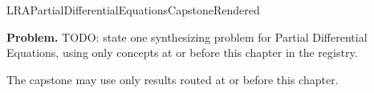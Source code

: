 \ifcsname LRAPartialDifferentialEquationsCapstoneRendered\endcsname
\else
\expandafter\gdef\csname LRAPartialDifferentialEquationsCapstoneRendered\endcsname{}

\newpage
{}
\label{cap:partial-differential-equations}

\begin{tcolorbox}[
  colback=gray!6,
  colframe=gray!40,
  arc=2pt,
  left=8pt, right=8pt, top=6pt, bottom=6pt,
  title={\small\textbf{Capstone Problem}},
  fonttitle=\small\bfseries
]
\textbf{Problem.}
TODO: state one synthesizing problem for Partial Differential Equations, using only concepts at or
before this chapter in the registry.
\end{tcolorbox}

\begin{remark*}
The capstone may use only results routed at or before this chapter.
\end{remark*}

\clearpage
\fi
